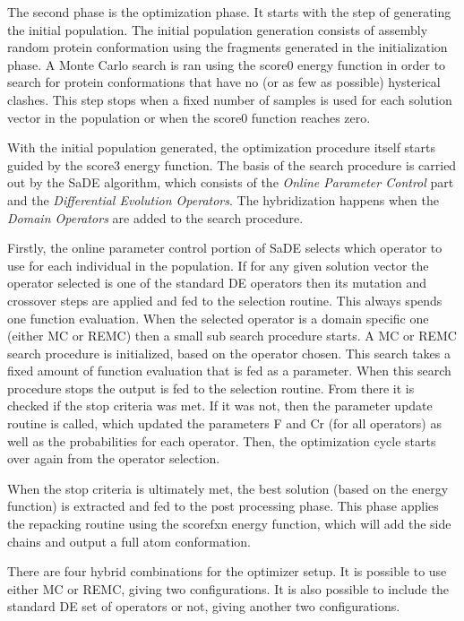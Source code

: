 The second phase is the optimization phase.  It starts with the step of
generating the initial population. The initial population generation consists of
assembly random protein conformation using the fragments generated in the initialization
phase. A Monte Carlo search is ran using the score0 energy function in order to
search for protein conformations that have no (or as few as possible) hysterical
clashes. This step stops when a fixed number of samples is used for each solution vector
in the population or when the score0 function reaches zero.

With the initial population generated, the optimization procedure itself starts
guided by the score3 energy function. The basis of
the search procedure is carried out by the \ac{SaDE} algorithm, which consists of the \textit{Online Parameter Control} part
and the \textit{Differential Evolution Operators}. The hybridization happens when the
\textit{Domain Operators} are added to the search procedure.

Firstly, the online parameter control portion of \ac{SaDE}
selects which operator to use for each individual in the population.
If for any given solution vector the operator selected is one of the standard DE
operators then its mutation and crossover steps are applied and fed to the selection
routine. This always spends one function evaluation. When the selected operator
is a domain specific one (either \ac{MC} or \ac{REMC}) then a small sub search procedure starts.
A \ac{MC} or \ac{REMC} search procedure is initialized, based on the operator chosen.
This search takes a fixed amount of function evaluation that is fed as a parameter.
When this search procedure stops the output is fed to the selection routine.
From there it is checked if the stop criteria was met. If it was not, then the
parameter update routine is called, which updated the parameters F and Cr
(for all operators) as well as the probabilities for each operator. Then, the
optimization cycle starts over again from the operator selection.

When the stop
criteria is ultimately met, the best solution (based on the energy function)
is extracted and fed to the post processing phase.
This phase applies the repacking routine using the scorefxn energy function,
which will add the side chains and output a full atom conformation.

There are four hybrid combinations for the optimizer setup. It is possible to use
either \ac{MC} or \ac{REMC}, giving two configurations. It is also possible to include the
standard DE set of operators or not, giving another two configurations.
